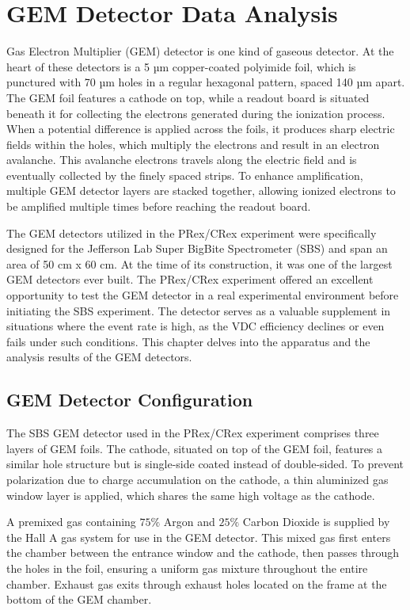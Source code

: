 \chapter{GEM Detector Data Analysis}

Gas Electron Multiplier (GEM) detector is one kind of gaseous detector. At the heart of these detectors is a 5 µm copper-coated polyimide foil, which is punctured with 70 µm holes in a regular hexagonal pattern, spaced 140 µm apart. The GEM foil features a cathode on top, while a readout board is situated beneath it for collecting the electrons generated during the ionization process. When a potential difference is applied across the foils, it produces sharp electric fields within the holes, which multiply the electrons and result in an electron avalanche. This avalanche electrons travels along the electric field and is eventually collected by the finely spaced strips. To enhance amplification, multiple GEM detector layers are stacked together, allowing ionized electrons to be amplified multiple times before reaching the readout board.

The GEM detectors utilized in the PRex/CRex experiment were specifically designed for the Jefferson Lab Super BigBite Spectrometer (SBS) and span an area of 50 cm x 60 cm. At the time of its construction, it was one of the largest GEM detectors ever built. The PRex/CRex experiment offered an excellent opportunity to test the GEM detector in a real experimental environment before initiating the SBS experiment. The detector serves as a valuable supplement in situations where the event rate is high, as the VDC efficiency declines or even fails under such conditions. This chapter delves into the apparatus and the analysis results of the GEM detectors.

\section{GEM Detector Configuration}

The SBS GEM detector used in the PRex/CRex experiment comprises three layers of GEM foils. The cathode, situated on top of the GEM foil, features a similar hole structure but is single-side coated instead of double-sided. To prevent polarization due to charge accumulation on the cathode, a thin aluminized gas window layer is applied, which shares the same high voltage as the cathode.

A premixed gas containing $75\%$ Argon and $25\%$ Carbon Dioxide is supplied by the Hall A gas system for use in the GEM detector. This mixed gas first enters the chamber between the entrance window and the cathode, then passes through the holes in the foil, ensuring a uniform gas mixture throughout the entire chamber. Exhaust gas exits through exhaust holes located on the frame at the bottom of the GEM chamber.

